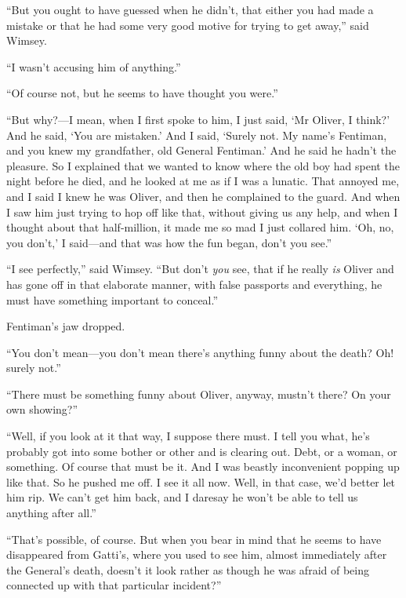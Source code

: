 \enquote{But you ought to have guessed when he didn't, that either you had made a mistake or that he had some very good motive for trying to get away,} said Wimsey.

\enquote{I wasn't accusing him of anything.}

\enquote{Of course not, but he seems to have thought you were.}

\enquote{But why?---I mean, when I first spoke to him, I just said, \enquote{Mr Oliver, I think?} And he said, \enquote{You are mistaken.} And I said, \enquote{Surely not. My name's Fentiman, and you knew my grandfather, old General Fentiman.} And he said he hadn't the pleasure. So I explained that we wanted to know where the old boy had spent the night before he died, and he looked at me as if I was a lunatic. That annoyed me, and I said I knew he was Oliver, and then he complained to the guard. And when I saw him just trying to hop off like that, without giving us any help, and when I thought about that half-million, it made me so mad I just collared him. \enquote{Oh, no, you don't,} I said\allowbreak---\allowbreak and that was how the fun began, don't you see.}

\enquote{I see perfectly,} said Wimsey. \enquote{But don't \textit{you} see, that if he really \textit{is} Oliver and has gone off in that elaborate manner, with false passports and everything, he must have something important to conceal.}

Fentiman's jaw dropped.

\enquote{You don't mean\allowbreak---\allowbreak you don't mean there's anything funny about the death? Oh! surely not.}

\enquote{There must be something funny about Oliver, anyway, mustn't there? On your own showing?}

\enquote{Well, if you look at it that way, I suppose there must. I tell you what, he's probably got into some bother or other and is clearing out. Debt, or a woman, or something. Of course that must be it. And I was beastly inconvenient popping up like that. So he pushed me off. I see it all now. Well, in that case, we'd better let him rip. We can't get him back, and I daresay he won't be able to tell us anything after all.}

\enquote{That's possible, of course. But when you bear in mind that he seems to have disappeared from Gatti's, where you used to see him, almost immediately after the General's death, doesn't it look rather as though he was afraid of being connected up with that particular incident?}

